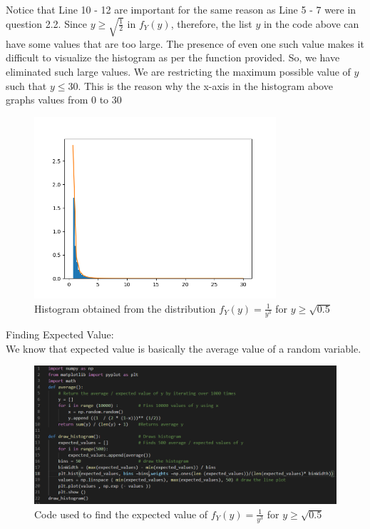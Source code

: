\documentclass[answers]{exam}
\begin{document}
\begin{framed}
Notice that Line 10 - 12 are important for the same reason as Line 5 - 7 were in question 2.2. 
Since $y \geq \sqrt{\frac{1}{2}}$ in $f_Y(y)$, therefore, the list $y$ in the code above can have some values that are too large. The presence of even one such value makes it difficult to visualize the histogram as per the function provided. So, we have eliminated such large values. We are restricting the maximum possible value of $y$ such that $y \leq 30$. This is the reason why the x-axis in the histogram above graphs values from 0 to 30\\

\begin{figure}[H] %
    \centering
    \includegraphics[width= 0.8\textwidth]{Q2.3_histogram.png}
    \caption{Histogram obtained from the distribution $f_Y(y) = \frac{1}{y^3}$ for $y \geq \sqrt{0.5}$}
\end{figure}

Finding Expected Value: \\
We know that expected value is basically the average value of a random variable. 

\begin{figure}[H] %
    \centering
    \includegraphics[width= 1\textwidth]{Q2.3_expected_value_code.PNG}
    \caption{Code used to find the expected value of $f_Y(y) = \frac{1}{y^3}$ for $y \geq \sqrt{0.5}$}
\end{figure}


\end{framed}
\end{document}
